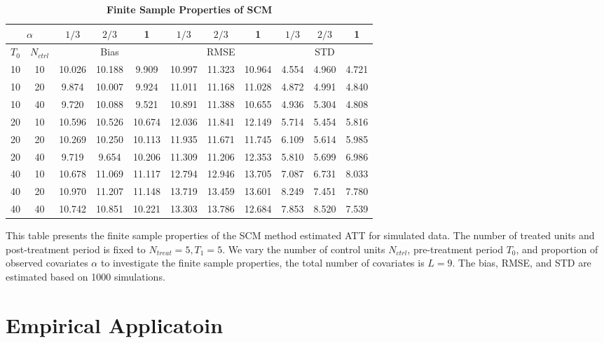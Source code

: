 \documentclass[12pt]{article}
\begin{document}
\begin{table}[!ht]
\centering
\caption{\textbf{Finite Sample Properties of SCM}}
\begin{tabular}{cc|ccc|ccc|ccc}
\toprule
\multicolumn{2}{c|}{$\alpha$} & $1/3$ & $2/3$ & 1 & $1/3$ & $2/3$ & 1 & $1/3$ & $2/3$ & 1 \\
\hline
$T_0$ & $N_{ctrl}$ & \multicolumn{3}{c|}{Bias} & \multicolumn{3}{c|}{RMSE}  & \multicolumn{3}{c}{STD} \\
\hline
10 & 10 & 10.026 & 10.188 & 9.909 & 10.997 & 11.323 & 10.964 & 4.554 & 4.960 & 4.721 \\
10 & 20 & 9.874 & 10.007 & 9.924 & 11.011 & 11.168 & 11.028 & 4.872 & 4.991 & 4.840 \\
10 & 40 & 9.720 & 10.088 & 9.521 & 10.891 & 11.388 & 10.655 & 4.936 & 5.304 & 4.808 \\
\cline{1-11}
20 & 10 & 10.596 & 10.526 & 10.674 & 12.036 & 11.841 & 12.149 & 5.714 & 5.454 & 5.816 \\
20 & 20 & 10.269 & 10.250 & 10.113 & 11.935 & 11.671 & 11.745 & 6.109 & 5.614 & 5.985 \\
20 & 40 & 9.719 & 9.654 & 10.206 & 11.309 & 11.206 & 12.353 & 5.810 & 5.699 & 6.986 \\
\cline{1-11}
40 & 10 & 10.678 & 11.069 & 11.117 & 12.794 & 12.946 & 13.705 & 7.087 & 6.731 & 8.033 \\
40 & 20 & 10.970 & 11.207 & 11.148 & 13.719 & 13.459 & 13.601 & 8.249 & 7.451 & 7.780 \\
40 & 40 & 10.742 & 10.851 & 10.221 & 13.303 & 13.786 & 12.684 & 7.853 & 8.520 & 7.539 \\
\bottomrule
\end{tabular}
\begin{tablenotes}
    \item This table presents the finite sample properties of the SCM method estimated ATT for simulated data. The number of treated units and post-treatment period is fixed to $N_{treat} = 5, T_1=5$. We vary the number of control units $N_{ctrl}$, pre-treatment period $T_0$, and proportion of observed covariates $\alpha$ to investigate the finite sample properties, the total number of covariates is $L=9$. The bias, RMSE, and STD are estimated based on 1000 simulations.
\end{tablenotes}
\end{table}

\section{Empirical Applicatoin} 
\label{sec: application app}
\end{document}
